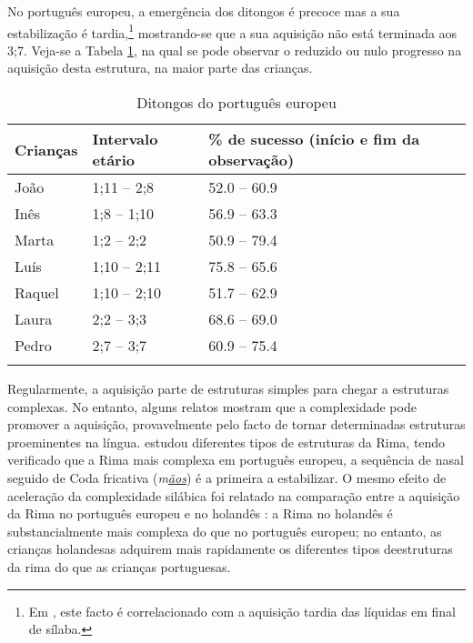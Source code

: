 \documentclass[output=paper]{LSP/langsci}
\begin{document}
No português europeu, a emergência dos ditongos é precoce mas a sua estabilização é tardia,\footnote{Em \citet{freitas1997}, este facto é correlacionado com a aquisição tardia das líquidas em final de sílaba.} mostrando-se que a sua aquisição não está terminada aos 3;7. Veja-se a Tabela \ref{tab:freitas_ditongos_ep}, na qual se pode observar o reduzido ou nulo progresso na aquisição desta estrutura, na maior parte das crianças.

\begin{table}
\begin{tabular}{lll}
\lsptoprule
Crianças & Intervalo etário & \% de sucesso (início e fim da observação) \\
\midrule
João     & 1;11 -- 2;8      & 52.0 -- 60.9                               \\
Inês     & 1;8 -- 1;10      & 56.9 -- 63.3                               \\
Marta    & 1;2 -- 2;2       & 50.9 -- 79.4                               \\
Luís     & 1;10 -- 2;11     & 75.8 -- 65.6                               \\
Raquel   & 1;10 -- 2;10     & 51.7 -- 62.9                               \\
Laura    & 2;2 -- 3;3       & 68.6 -- 69.0                               \\
Pedro    & 2;7 -- 3;7       & 60.9 -- 75.4 \\                             
\lspbottomrule
\end{tabular}
  \caption{Ditongos do português europeu \citep{freitas1997}}
  \label{tab:freitas_ditongos_ep}
\end{table}

Regularmente, a aquisição parte de estruturas simples para chegar a estruturas complexas. No entanto, alguns relatos mostram que a complexidade pode promover a aquisição, provavelmente pelo facto de tornar determinadas estruturas proeminentes na língua. \citet{correia2004} estudou diferentes tipos de estruturas da Rima, tendo verificado que a Rima mais complexa em português europeu, a sequência de  nasal seguido de Coda fricativa (\textit{m\underline{ãos}}) é a primeira a estabilizar. O mesmo efeito de aceleração da complexidade silábica foi relatado na comparação entre a aquisição da Rima no português europeu e no holandês \citep{fikkertfreitas1998}: a Rima no holandês é substancialmente mais complexa do que no português europeu; no entanto, as crianças holandesas adquirem mais rapidamente os diferentes tipos de\largerpage estruturas da rima do que as crianças portuguesas.
\end{document}
